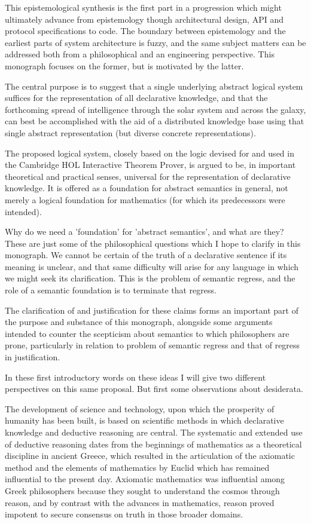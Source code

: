 This epistemological synthesis is the first part in a progression which might ultimately advance from epistemology though architectural design, API and protocol specifications to code.
The boundary between epistemology and the earliest parts of system architecture is fuzzy, and the same subject matters can be addressed both from a philosophical and an engineering perspective.
This monograph focuses on the former, but is motivated by the latter.

The central purpose is to suggest that a single underlying abstract logical system suffices for the representation of all declarative knowledge, and that the forthcoming spread of intelligence through the solar system and across the galaxy, can best be accomplished with the aid of a distributed knowledge base using that single abstract representation (but diverse concrete representations).

The proposed logical system, closely based on the logic devised for and used in the Cambridge HOL Interactive Theorem Prover\cite{gordon1993}, is argued to be, in important theoretical and practical senses, universal for the representation of declarative knowledge.
It is offered as a foundation for abstract semantics in general, not merely a logical foundation for mathematics (for which its predecessors were intended).

Why do we need a 'foundation' for 'abstract semantics', and what are they?
These are just some of the philosophical questions which I hope to clarify in this monograph.
We cannot be certain of the truth of a declarative sentence if its meaning is unclear, and that same difficulty will arise for any language in which we might seek its clarification.
This is the problem of semantic regress, and the role of a semantic foundation is to terminate that regress.

The clarification of and justification for these claims forms an important part of the purpose and substance of this monograph, alongside some arguments intended to counter the scepticism about semantics to which philosophers are prone, particularly in relation to problem of semantic regress and that of regress in justification.

In these first introductory words on these ideas I will give two different perspectives on this same proposal.
But first some observations about desiderata.

The development of science and technology, upon which the prosperity of humanity has been built, is based on scientific methods in which declarative knowledge and deductive reasoning are central.
The systematic and extended use of deductive reasoning dates from the beginnings of mathematics as a theoretical discipline in ancient Greece, which resulted in the articulation of the axiomatic method and the elements of mathematics by Euclid which has remained influential to the present day.
Axiomatic mathematics was influential among Greek philosophers because they sought to understand the cosmos through reason, and by contrast with the advances in mathematics, reason proved impotent to secure consensus on truth in those broader domains.

